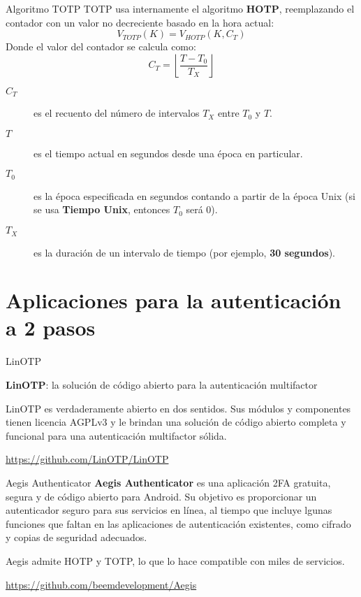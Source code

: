 \begin{frame}[c]{Algoritmo TOTP}
  TOTP usa internamente el algoritmo \textbf{HOTP}, reemplazando
  el contador con un valor no decreciente basado en la hora actual:
  \begin{displaymath}
    V_{TOTP}(K) = V_{HOTP}(K, C_T)
  \end{displaymath}
  Donde el valor del contador se calcula como:
  \begin{displaymath}
    C_T = \left\lfloor \frac{T - T_0}{T_X} \right\rfloor
  \end{displaymath}
  \begin{description}
    \item [$C_T$] es el recuento del número de intervalos $T_X$ entre
      $T_0$ y $T$.
    \item [$T$] es el tiempo actual en segundos desde una época en particular.
    \item [$T_0$] es la época especificada en segundos contando a partir
      de la época Unix (si se usa \textbf{Tiempo Unix}, entonces $T_0$ será
      $0$).
    \item [$T_X$] es la duración de un intervalo de tiempo (por ejemplo,
      \textbf{30 segundos}).
  \end{description}
\end{frame}

\section{Aplicaciones para la autenticación a 2 pasos}

\begin{frame}[c]{LinOTP}

  \textbf{LinOTP}: la solución de código abierto para la
  autenticación multifactor

  \vspace{\baselineskip}
  LinOTP es verdaderamente abierto en dos sentidos.
  Sus módulos y componentes tienen licencia AGPLv3 y le
  brindan una solución de código abierto completa y
  funcional para una autenticación multifactor sólida.

  \vspace{\baselineskip}
  \href{https://github.com/LinOTP/LinOTP}{https://github.com/LinOTP/LinOTP}
\end{frame}

\begin{frame}[c]{Aegis Authenticator}
  \textbf{Aegis Authenticator} es una aplicación 2FA gratuita, segura y
  de código abierto para Android. Su objetivo es proporcionar un
  autenticador seguro para sus servicios en línea, al tiempo que incluye 
  lgunas funciones que faltan en las aplicaciones de autenticación
  existentes, como cifrado y copias de seguridad adecuados.

  \vspace{\baselineskip}
  Aegis admite HOTP y TOTP, lo que lo hace compatible con miles de servicios.

  \vspace{\baselineskip}
  \href{https://github.com/beemdevelopment/Aegis}{https://github.com/beemdevelopment/Aegis}
\end{frame}

